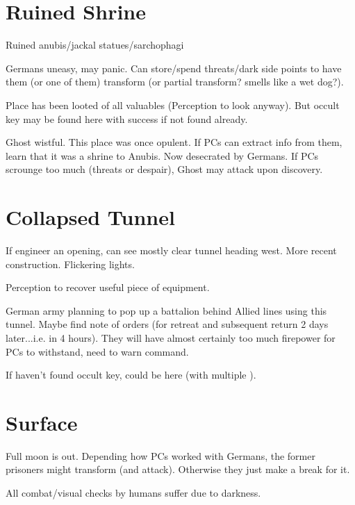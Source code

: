 \documentclass{book}
\newcommand{\df}{\DifficultyDie}
\newcommand{\stb}{\SetbackDie}
\newcommand{\ch}{\ChallengeDie}
\begin{document}
\begin{multicols}{2}
\section{Ruined Shrine}

Ruined anubis/jackal statues/sarchophagi

Germans uneasy, may panic.  Can store/spend threats/dark side points to have them (or one of them) transform (or partial transform?  smells like a wet dog?).

Place has been looted of all valuables (\ch\df\stb\stb Perception to look anyway).  But occult key may be found here with success if not found already.

Ghost wistful.  This place was once opulent.  If PCs can extract info from them, learn that it was a shrine to Anubis.  Now desecrated by Germans.  If PCs scrounge too much (threats or despair), Ghost may attack upon discovery.


\section{Collapsed Tunnel}

If engineer an opening, can see mostly clear tunnel heading west.  More recent construction.  Flickering lights.

\df\df Perception to recover useful piece of equipment.

German army planning to pop up a battalion behind Allied lines using this tunnel.  Maybe find note of orders (for retreat and subsequent return 2 days later...i.e. in 4 hours).  They will have almost certainly too much firepower for PCs to withstand, need to warn command.

If haven't found occult key, could be here (with multiple \Advantage).

\section{Surface}

Full moon is out.  Depending how PCs worked with Germans, the former prisoners might transform (and attack).  Otherwise they just make a break for it.

All combat/visual checks by humans suffer \stb due to darkness.


\end{multicols}
\end{document}
